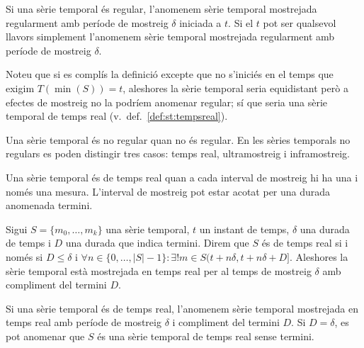 Si una sèrie temporal és regular, l'anomenem sèrie temporal mostrejada
regularment amb període de mostreig $\delta$ iniciada a $t$. Si el $t$
pot ser qualsevol llavors simplement l'anomenem sèrie temporal
mostrejada regularment amb període de mostreig $\delta$.

Noteu que si es complís
la definició excepte que no s'iniciés en el temps que exigim
$T(\min(S))=t$, aleshores la sèrie temporal seria equidistant però a
efectes de mostreig no la podríem anomenar regular; sí que seria una
sèrie temporal de temps real (v.\ def.~\ref{def:st:tempsreal}).


Una sèrie temporal és no regular quan no és regular. 
En les sèries temporals no regulars es poden distingir tres casos: temps real, ultramostreig i inframostreig.

Una sèrie temporal és de temps real quan a cada interval de mostreig hi ha una i només una mesura. L'interval de mostreig pot estar acotat per una durada anomenada termini.

\begin{definition}\label{def:st:tempsreal}
  Sigui $S=\{m_0,\dotsc,m_k\}$ una sèrie temporal, $t$ un instant de
  temps, $\delta$ una durada de temps i $D$ una durada que indica
  termini. Direm que $S$ és de temps real si i només si $D\leq\delta$
  i $\forall n\in\{0,\ldots,|S|-1\}: \exists!m \in
  S(t+n\delta,t+n\delta+D]$.  Aleshores la sèrie temporal està
  mostrejada en temps real per al temps de mostreig $\delta$ amb
  compliment del termini $D$.
\end{definition}

Si una sèrie temporal és de temps real, l'anomenem  sèrie temporal mostrejada
en temps real amb període de mostreig $\delta$ i compliment del termini $D$.
Si $D=\delta$, es pot anomenar que $S$ és una sèrie temporal de temps real sense termini.




